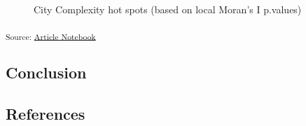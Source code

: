 \documentclass[
  number]{elsarticle}
\begin{document}
\label{cell-fig-complexity-hot-spots}
\begin{figure}[H]


\caption{\label{fig-complexity-hot-spots}City Complexity hot spots
(based on local Moran's I p.values)}

\end{figure}%

\textsubscript{Source:
\href{https://aiti-flinders.github.io/sirp-complexity/index.qmd.html}{Article
Notebook}}

\subsection{Conclusion}\label{conclusion}

\subsection*{References}\label{references}

\renewcommand{\bibsection}{}

\end{document}

